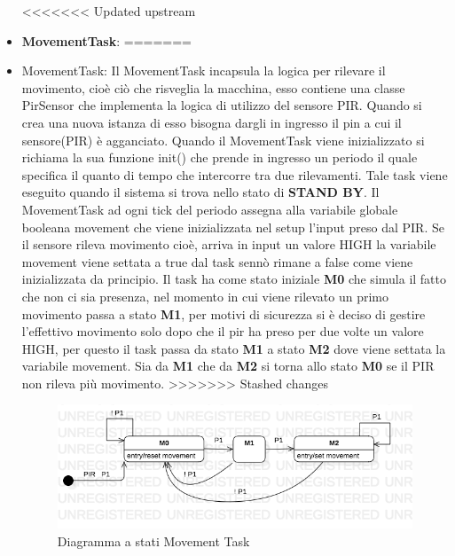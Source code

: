 \documentclass[a4paper]{article}
\begin{document}
\begin{itemize}
<<<<<<< Updated upstream
\item \textbf{MovementTask}:
=======
\item {MovementTask}:
Il MovementTask incapsula la logica per rilevare il movimento, cioè ciò che risveglia la macchina, esso contiene una classe PirSensor che implementa la logica di utilizzo del sensore PIR. Quando si crea una nuova istanza di esso bisogna dargli in ingresso il pin a cui il sensore(PIR) è agganciato. 
Quando il MovementTask viene inizializzato si richiama la sua funzione init() che prende in ingresso un periodo il quale specifica il quanto di tempo che intercorre tra due rilevamenti. 
Tale task viene eseguito quando il sistema si trova nello stato di \textbf{STAND BY}. Il MovementTask ad ogni tick del periodo assegna alla
variabile globale booleana movement che viene inizializzata nel setup l'input preso dal PIR. Se il sensore rileva movimento cioè, arriva in input un valore HIGH la variabile movement viene settata a true dal task sennò rimane a false come viene inizializzata da principio.  
Il task ha come stato iniziale \textbf{M0} che simula il fatto che non ci sia presenza, nel momento in cui viene rilevato un primo movimento passa a stato \textbf{M1}, per motivi di sicurezza si è deciso di gestire l'effettivo movimento solo dopo che il pir ha preso per due volte un valore HIGH, per questo il task passa da stato \textbf{M1} a stato \textbf{M2} dove viene settata la variabile movement. Sia da  \textbf{M1} che da \textbf{M2} si torna allo stato \textbf{M0} se il PIR non rileva più movimento. 
>>>>>>> Stashed changes

\begin{figure}[h!]
	\includegraphics[scale = 0.60]{MovementTask.png}
	\caption{Diagramma a stati Movement Task}
\end{figure}

\newpage


\end{itemize}
\end{document}
